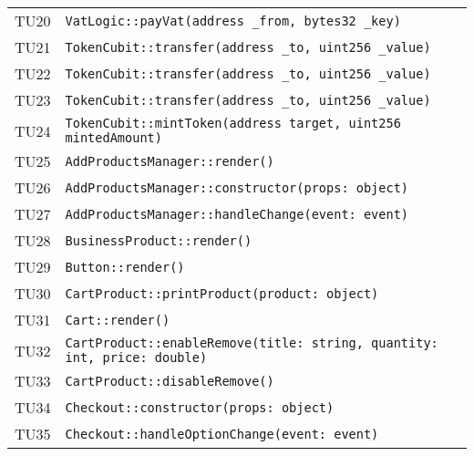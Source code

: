 \begin{longtable}{ >{\centering}p{} >{}p{}}
			\hypertarget{TU20}{TU20} & \texttt{VatLogic::payVat(address \_from, 
			bytes32 \_key)}\\
			
			\hypertarget{TU21}{TU21} & \texttt{TokenCubit::transfer(address 
			\_to, uint256 \_value)}\\
			
			\hypertarget{TU22}{TU22} & \texttt{TokenCubit::transfer(address 
				\_to, uint256 \_value)}\\
			
			\hypertarget{TU23}{TU23} & \texttt{TokenCubit::transfer(address 
				\_to, uint256 \_value)}\\
			
			\hypertarget{TU24}{TU24} & \texttt{TokenCubit::mintToken(address 
			target, uint256 mintedAmount)}\\
		
			\hypertarget{TU25}{TU25} & \texttt{AddProductsManager::render()}\\
			
			\hypertarget{TU26}{TU26} & 
			\texttt{AddProductsManager::constructor(props: object)}\\
			
			\hypertarget{TU27}{TU27} & 
			\texttt{AddProductsManager::handleChange(event: event)}\\
			
			\hypertarget{TU28}{TU28} & 
			\texttt{BusinessProduct::render()}\\
			
			\hypertarget{TU29}{TU29} & 
			\texttt{Button::render()}\\
			
			\hypertarget{TU30}{TU30} & 
			\texttt{CartProduct::printProduct(product: object)}\\
			
			\hypertarget{TU31}{TU31} & 
			\texttt{Cart::render()}\\
			
			\hypertarget{TU32}{TU32} & 
			\texttt{CartProduct::enableRemove(title: string, quantity: int, 
			price: double)}\\
		
			\hypertarget{TU33}{TU33} & 
			\texttt{CartProduct::disableRemove()}\\
			
			\hypertarget{TU34}{TU34} & 
			\texttt{Checkout::constructor(props: object)}\\
			
			\hypertarget{TU35}{TU35} & 
			\texttt{Checkout::handleOptionChange(event: event)}\\
			

\end{longtable}
